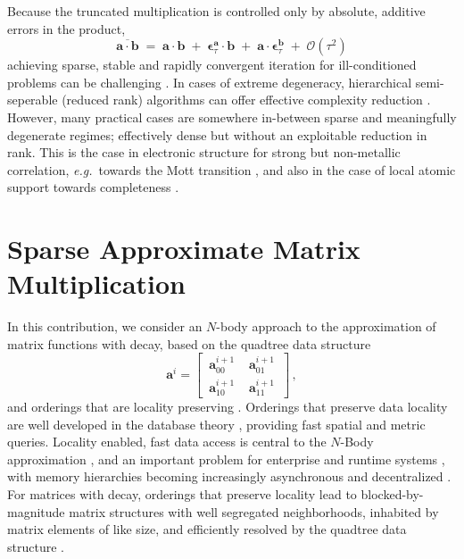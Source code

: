 \documentclass[letterpaper,twocolumn,amsmath,amsfont,amssymb,english,aps,jcp,preprintnumbers,groupaddress,nofootinbib,tightenlines,floatfix]{revtex4}
\newcommand{\mat}[1]{\boldsymbol{#1}}
\theoremstyle{plain}
\theoremstyle{remark}
\theoremstyle{plain}
\begin{document}
Because the truncated multiplication is controlled only by absolute,
additive errors in the product,
\begin{equation} \label{sparseapprox}
\overline{ \mat{a} \cdot \mat{b} }\; = \; \mat{a}\cdot\mat{b} \; +\; \mat{\epsilon}^{\mat{a}}_\tau \cdot \mat{b} \;+\;
 \mat{a} \cdot \mat{\epsilon}^{\mat{b}}_\tau  \; + \;   {\mathcal O}(\tau^2)
\end{equation}
achieving sparse, stable and rapidly convergent iteration for
ill-conditioned problems can be challenging \cite{}.  In cases of
extreme degeneracy, hierarchical semi-seperable (reduced rank)
algorithms can offer effective complexity reduction \cite{}.  However,
many practical cases are somewhere in-between sparse and meaningfully
degenerate regimes; effectively dense but without an exploitable
reduction in rank.  This is the case in electronic structure for
strong but non-metallic correlation, {\em e.g.}~towards the Mott
transition \cite{}, and also in the case of local atomic support
towards completeness \cite{Others, Hutter, Gigi}.

\pagebreak

\section{Sparse Approximate Matrix Multiplication}

In this contribution, we consider an $N$-body approach to the
approximation of matrix functions with decay, based on the quadtree
data structure \cite{wise, samet}
\begin{equation}
\mat{a}^i = \begin{bmatrix} \,  \mat{a}^{i+1}_{00} \, & \,  \mat{a}^{i+1}_{01} \,  \\[0.2cm]  \, \mat{a}^{i+1}_{10} \,  & \,\mat{a}^{i+1}_{11} \, \end{bmatrix} \, ,
\end{equation}
and orderings that are locality preserving \cite{}.  Orderings that
preserve data locality are well developed in the database theory
\cite{}, providing fast spatial and metric queries.  Locality
enabled, fast data access is central to the $N$-Body approximation
\cite{}, and an important problem for enterprise \cite{} and runtime
systems \cite{}, with memory hierarchies becoming increasingly
asynchronous and decentralized \cite{cache}.  For matrices with
decay, orderings that preserve locality lead to blocked-by-magnitude
matrix structures with well segregated neighborhoods, inhabited by
matrix elements of like size, and efficiently resolved by the quadtree
data structure \cite{}.
\end{document}
